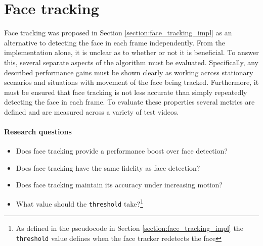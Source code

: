 \section{Face tracking}
\label{section:face_tracking}
Face tracking was proposed in Section \ref{section:face_tracking_impl} as an alternative to detecting the face in each frame independently.
From the implementation alone, it is unclear as to whether or not it is beneficial. To answer this, several separate aspects of the algorithm must be evaluated. 
Specifically, any described performance gains must be shown clearly as working across stationary scenarios and situations with movement of the face being tracked. Furthermore, it must be ensured that face tracking is not less accurate than simply repeatedly detecting the face in each frame. To evaluate these properties several metrics are defined and are measured across a variety of test videos.
\paragraph{Research questions}
\begin{itemize}
    \item Does face tracking provide a performance boost over face detection?
    \item Does face tracking have the same fidelity as face detection?
    \item Does face tracking maintain its accuracy under increasing motion?
    \item What value should the \texttt{threshold} take?\footnote{As defined in the pseudocode in Section \ref{section:face_tracking_impl} the \texttt{threshold} value defines when the face tracker redetects the face}
\end{itemize}

